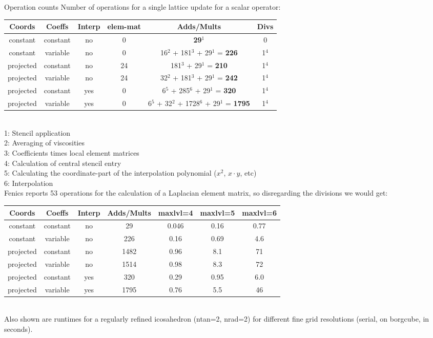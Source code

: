 \documentclass[a4paper,11pt,reqno]{amsart}
\numberwithin{figure}{section}
\numberwithin{table}{section}
\numberwithin{figure}{section}
\begin{document}
\clearpage

\begin{section}{Operation counts}
\label{sec:operationCounts}
%
Number of operations for a single lattice update for a scalar operator:\\
%
\begin{tabular}{c|c|c|c|c|c}
 \textbf{Coords} & \textbf{Coeffs} & \textbf{Interp} & \textbf{elem-mat} & \textbf{Adds/Mults} & \textbf{Divs} \\
 \hline
 constant  & constant & no  & 0  & \textbf{29}$^1$                                    & 0     \\
 constant  & variable & no  & 0  & 16$^2$ + 181$^3$ + 29$^1$ = \textbf{226}           & 1$^4$ \\
 projected & constant & no  & 24 & 181$^3$ + 29$^1$ = \textbf{210}                    & 1$^4$ \\
 projected & variable & no  & 24 & 32$^2$ + 181$^3$ + 29$^1$ = \textbf{242}           & 1$^4$ \\
 projected & constant & yes & 0  & 6$^5$ + 285$^6$ + 29$^1$ = \textbf{320}            & 1$^4$ \\
 projected & variable & yes & 0  & 6$^5$ + 32$^2$ + 1728$^6$ + 29$^1$ = \textbf{1795} & 1$^4$ \\
\end{tabular}\\
%
1: Stencil application\\
2: Averaging of viscosities\\
3: Coefficients times local element matrices\\
4: Calculation of central stencil entry\\
5: Calculating the coordinate-part of the interpolation polynomial ($x^2$, $x \cdot y$, etc)\\
6: Interpolation\\

Fenics reports 53 operations for the calculation of a Laplacian element matrix, so disregarding the divisions we would get:\\
%
\begin{tabular}{c|c|c|c|c|c|c}
 \textbf{Coords} & \textbf{Coeffs} & \textbf{Interp} & \textbf{Adds/Mults} & \textbf{maxlvl=4} & \textbf{maxlvl=5} & \textbf{maxlvl=6} \\
 \hline
 constant  & constant & no  & 29   & 0.046 & 0.16 & 0.77 \\
 constant  & variable & no  & 226  & 0.16  & 0.69 & 4.6  \\
 projected & constant & no  & 1482 & 0.96  & 8.1  & 71   \\
 projected & variable & no  & 1514 & 0.98  & 8.3  & 72   \\
 projected & constant & yes & 320  & 0.29  & 0.95 & 6.0  \\
 projected & variable & yes & 1795 & 0.76  & 5.5  & 46   \\
\end{tabular}\\
Also shown are runtimes for a regularly refined icosahedron (ntan=2, nrad=2) for different fine grid resolutions (serial, on borgcube, in seconds).


\end{section}
\end{document}
